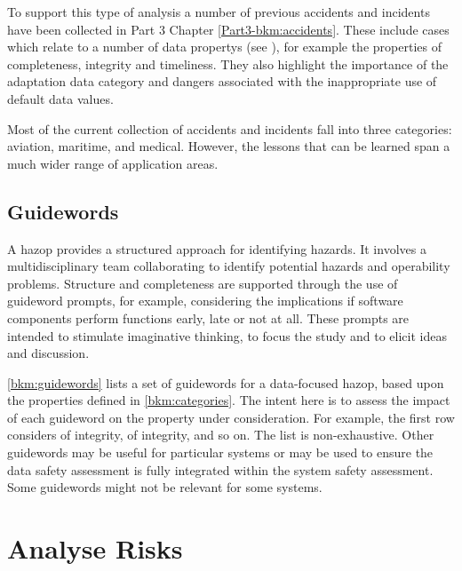 To support this type of analysis a number of previous accidents and incidents have been collected in Part 3 Chapter \autoref{Part3-bkm:accidents}.
These include cases which relate to a number of \glspl{data property} (see
),
for example the properties of \gls{completeness}, \gls{integrity} and \gls{timeliness}.
They also highlight the importance of the \gls{adaptation data} category and dangers associated with the inappropriate use of default data values.

Most of the current collection of accidents and incidents fall into three categories: aviation, maritime, and medical. However, the lessons that can be learned span a much wider range of application areas.

\subsection{ Guidewords}
A \gls{hazop} \cite{citation:iec61882:2016}
provides a structured approach for identifying hazards. It involves a multidisciplinary team collaborating to identify potential hazards and operability problems. Structure and \gls{completeness} are supported through the use of guideword prompts, for example, considering the implications if software components perform functions early, late or not at all. These prompts are intended to stimulate imaginative thinking, to focus the study and to elicit ideas and discussion.

\autoref{bkm:guidewords} lists a set of guidewords for a data-focused \gls{hazop}, based upon the properties defined in \autoref{bkm:categories}. The intent here is to assess the impact of each guideword on the property under consideration. For example, the first row considers  of \gls{integrity},  of \gls{integrity}, and so on.
The list is non-exhaustive. Other guidewords may be useful for particular systems or may be used to ensure the \gls{data safety assessment} is fully integrated within the system safety assessment. Some guidewords might not be relevant for some systems.
\clearpage
\section{Analyse Risks}
